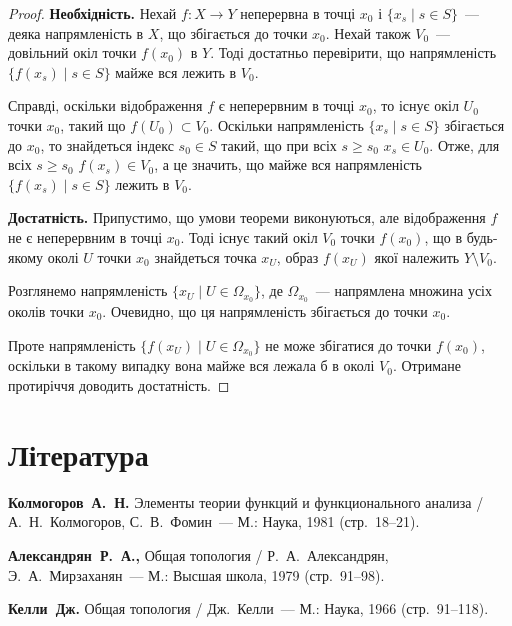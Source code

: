 \begin{proof}
    \textbf{Необхідність.} Нехай $f: X \to Y$ неперервна в точці $x_0$ і $\{x_s \mid s \in S\}$~--- деяка напрямленість в $X$, що збігається до точки $x_0$. Нехай також $V_0$~--- довільний окіл точки $f(x_0)$ в $Y$. Тоді достатньо перевірити, що напрямленість~$\{f(x_s) \mid s \in S\}$ майже вся лежить в $V_0$. 
    
    Справді, оскільки відображення $f$ є неперервним в точці $x_0$, то існує окіл $U_0$ точки $x_0$, такий що $f(U_0) \subset V_0$. Оскільки напрямленість $\{x_s \mid s \in S\}$ збігається до $x_0$, то знайдеться індекс $s_0 \in S$ такий, що при всіх $s \ge s_0$ $x_s \in U_0$. Отже, для всіх $s \ge s_0$ $f(x_s) \in V_0$, а це значить, що майже вся напрямленість $\{f(x_s) \mid s \in S\}$ лежить в $V_0$. 

    \textbf{Достатність.} Припустимо, що умови теореми виконуються, але відображення $f$ не є неперервним в точці $x_0$. Тоді існує такий окіл $V_0$ точки $f(x_0)$, що в будь-якому околі $U$ точки $x_0$ знайдеться точка $x_U$, образ $f(x_U)$ якої належить $Y \setminus V_0$. 

    Розглянемо напрямленість $\{x_U \mid U \in \Omega_{x_0}\}$, де $\Omega_{x_0}$~--- напрямлена множина усіх околів точки $x_0$. Очевидно, що ця напрямленість збігається до точки $x_0$. 

    Проте напрямленість $\{ f(x_U) \mid U \in \Omega_{x_0}\}$ не може збігатися до точки $f(x_0)$, оскільки в такому випадку вона майже вся лежала б в околі $V_0$. Отримане протиріччя доводить достатність.
\end{proof}

\section{Література}

\begin{enumerate}[label={[\arabic*]}]
\item \textbf{Колмогоров~А.~Н.}
Элементы теории функций и функционального анализа /
А.~Н.~Колмогоров, С.~В.~Фомин~---
М.: Наука, 1981 (стр.~18--21).
\item \textbf{Александрян~Р.~А., }
Общая топология /
Р.~А.~Александрян, Э.~А.~Мирзаханян~---
М.: Высшая школа, 1979 (стр.~91--98).
\item \textbf{Келли~Дж.}
Общая топология /
Дж.~Келли~---
М.: Наука, 1966 (стр.~91--118).
\end{enumerate}
